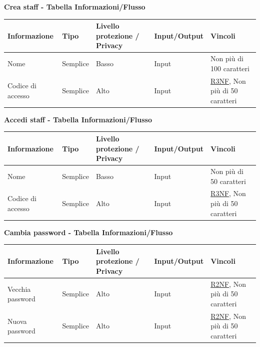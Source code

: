 \documentclass[a4paper]{article}
\begin{document}
\textbf{Crea staff  - Tabella Informazioni/Flusso}

\begin{center}
    \begin{tabularx}{1\textwidth}{|X|X|X|X|X|}
        \hline
        \textbf{Informazione} &\textbf{Tipo} & \textbf{Livello protezione / Privacy} & \textbf{Input/Output} & \textbf{Vincoli}\\
        \hline
        \hline
        Nome & Semplice & Basso & Input & Non più di 100 caratteri\\
        \hline
        Codice di accesso & Semplice & Alto & Input & \hyperlink{R3NF}{R3NF}, Non più di 50 caratteri\\
        \hline
    \end{tabularx}
\end{center}

\textbf{Accedi staff  - Tabella Informazioni/Flusso}

\begin{center}
    \begin{tabularx}{1\textwidth}{|X|X|X|X|X|}
        \hline
        \textbf{Informazione} &\textbf{Tipo} & \textbf{Livello protezione / Privacy} & \textbf{Input/Output} & \textbf{Vincoli}\\
        \hline
        \hline
        Nome & Semplice & Basso & Input & Non più di 50 caratteri\\
        \hline
        Codice di accesso & Semplice & Alto & Input & \hyperlink{R3NF}{R3NF}, Non più di 50 caratteri\\
        \hline
    \end{tabularx}
\end{center}

\textbf{Cambia password  - Tabella Informazioni/Flusso}

\begin{center}
    \begin{tabularx}{1\textwidth}{|X|X|X|X|X|}
        \hline
        \textbf{Informazione} &\textbf{Tipo} & \textbf{Livello protezione / Privacy} & \textbf{Input/Output} & \textbf{Vincoli}\\
        \hline
        \hline
        Vecchia password & Semplice & Alto & Input & \hyperlink{R2NF}{R2NF}, Non più di 50 caratteri\\
        \hline
        Nuova password & Semplice & Alto & Input & \hyperlink{R2NF}{R2NF}, Non più di 50 caratteri\\
        \hline
    \end{tabularx}
\end{center}
\end{document}
